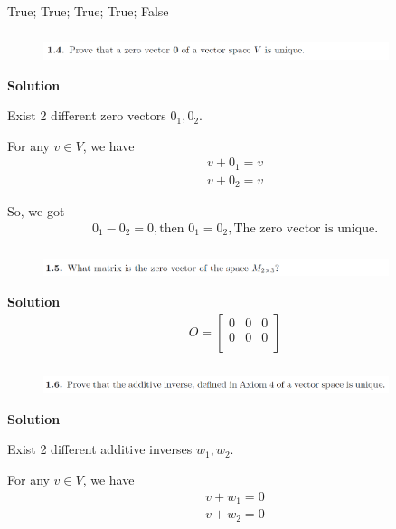 \documentclass[cs4size,a4paper]{ctexart}
\numberwithin{equation}{section}
\numberwithin{table}{section}
\numberwithin{figure}{section}
\begin{document}
	  True;	  True;	  True;	  True;	  False

 \subsubsection{}
\begin{figure}[H]
	\centering
	\includegraphics[width=0.9\textwidth]{1-4.png}
\end{figure}
\textbf{Solution}

\begin{assumption}
	Exist 2 different zero vectors $0_1, 0_2$. 
\end{assumption}
For any $v\in V $, we have
\begin{align}
	v + 0_1 = v\\
	v + 0_2 = v
\end{align}

So, we got 
\begin{align}
	0_1 - 0_2 = 0, \text{then } 0_1 = 0_2,\text{The zero vector is unique.}
\end{align}
 \subsubsection{}
\begin{figure}[H]
	\centering
	\includegraphics[width=0.9\textwidth]{1-5.png}
\end{figure}
\textbf{Solution}
\begin{align}
	O=\left[ \begin{matrix}
		0&		0    &0\\
		0&		0    &0\\
	\end{matrix} \right] 	
\end{align}
 \subsubsection{}
\begin{figure}[H]
	\centering
	\includegraphics[width=0.9\textwidth]{1-6.png}
\end{figure}
\textbf{Solution}
\begin{assumption}
	Exist 2 different additive inverses $w_1, w_2$. 
\end{assumption}
For any $v\in V $, we have
\begin{align}
	v + w_1 = 0\\
	v + w_2 = 0
\end{align}
\end{document}
